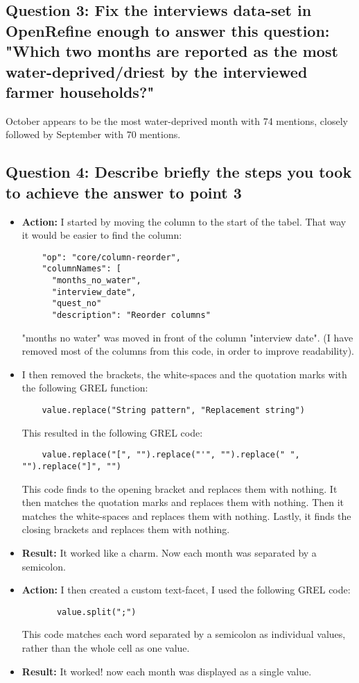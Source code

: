 \documentclass{article}
\begin{document}
\subsection{Question 3: Fix the interviews data-set in OpenRefine enough to answer this question: "Which two months are reported as the most water-deprived/driest by the interviewed farmer households?"}
October appears to be the most water-deprived month with 74 mentions, closely followed by September with 70 mentions. 

\subsection{Question 4: Describe briefly the steps you took to achieve the answer to point 3}

\begin{itemize}
    \item \textbf{Action:} I started by moving the column to the start of the tabel. That way it would be easier to find the column: 
    \begin{verbatim}
    "op": "core/column-reorder",
    "columnNames": [
      "months_no_water",
      "interview_date",
      "quest_no"
      "description": "Reorder columns"
    \end{verbatim}
    "months no water" was moved in front of the column "interview date". (I have removed most of the columns from this code, in order to improve readability).
    \item I then removed the brackets, the white-spaces and the quotation marks with the following GREL function:
    \begin{verbatim}
    value.replace("String pattern", "Replacement string")
    \end{verbatim}
    This resulted in the following GREL code:
    \begin{verbatim}
    value.replace("[", "").replace("'", "").replace(" ", "").replace("]", "")
    \end{verbatim}
   This code finds to the opening bracket and replaces them with nothing. It then matches the quotation marks and replaces them with nothing. Then it matches the white-spaces and replaces them with nothing. Lastly, it finds the closing brackets and replaces them with nothing. 
   \item\textbf{Result:} It worked like a charm. Now each month was separated by a semicolon.
   \item \textbf{Action:} I then created a custom text-facet, I used the following GREL code:
   \begin{verbatim}
       value.split(";")
   \end{verbatim}
   This code matches each word separated by a semicolon as individual values, rather than the whole cell as one value. 
   \item\textbf{Result:} It worked! now each month was displayed as a single value. 
\end{itemize}
\end{document}
